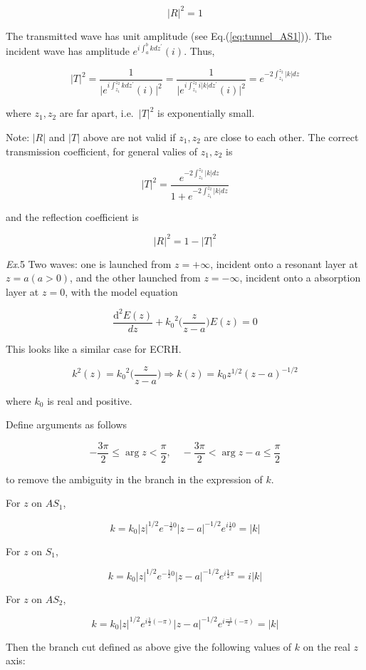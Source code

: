 \documentclass[
  notoc %
]{tufte-book}
\begin{document}
\[
|R|^2 = 1
\]

The transmitted wave has unit amplitude (see Eq.(\ref{eq:tunnel_AS1})).
The incident wave has amplitude \(e^{i\int_a^b kdz^\prime}(i)\). Thus,

\[
|T|^2 = \frac{1}{\big| e^{i\int_{z_1}^{z_2} kdz^\prime}(i) \big|^2} = \frac{1}{\big| e^{i\int_{z_1}^{z_2} i|k|dz^\prime}(i) \big|^2}  = e^{-2\int_{z_1}^{z_2} |k|dz}
\]

where \(z_1,z_2\) are far apart, i.e.~\(|T|^2\) is exponentially small.

Note: \(|R|\) and \(|T|\) above are not valid if \(z_1,z_2\) are close
to each other. The correct transmission coefficient, for general valies
of \(z_1,z_2\) is

\[
|T|^2 = \frac{e^{-2\int_{z_1}^{z_2} |k|dz}}{1+e^{-2\int_{z_1}^{z_2} |k|dz}}
\]

and the reflection coefficient is

\[
|R|^2 = 1- |T|^2
\]

\emph{Ex}.5 Two waves: one is launched from \(z=+\infty\), incident onto
a resonant layer at \(z=a (a>0)\), and the other launched from
\(z=-\infty\), incident onto a absorption layer at \(z=0\), with the
model equation

\[
\frac{\mathrm{d}^2 E(z)}{dz} + {k_0}^2 \Big( \frac{z}{z-a}\Big) E(z) = 0
\]

This looks like a similar case for ECRH.

\[
k^2(z) =  {k_0}^2 \Big( \frac{z}{z-a}\Big) \Rightarrow k(z) = k_0 z^{1/2}(z-a)^{-1/2}
\]

where \(k_0\) is real and positive.

Define arguments as follows

\[
-\frac{3\pi}{2}\le \arg{z} < \frac{\pi}{2},\quad -\frac{3\pi}{2}<\arg{z-a} \le \frac{\pi}{2}
\]

to remove the ambiguity in the branch in the expression of \(k\).

For \(z\) on \(AS_1\),

\[
k = k_0 |z|^{1/2}e^{-\frac{1}{2}0}|z-a|^{-1/2}e^{i\frac{1}{2}0} = |k|
\]

For \(z\) on \(S_1\),

\[
k = k_0 |z|^{1/2}e^{-\frac{1}{2}0}|z-a|^{-1/2}e^{i\frac{1}{2}\pi} = i|k|
\]

For \(z\) on \(AS_2\),

\[
k = k_0 |z|^{1/2}e^{i\frac{1}{2}(-\pi)}|z-a|^{-1/2}e^{i\frac{-1}{2}(-\pi)} = |k|
\]

Then the branch cut defined as above give the following values of \(k\)
on the real \(z\) axis:
\end{document}
